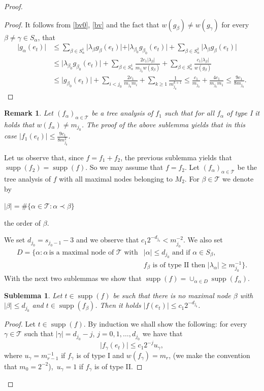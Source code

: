\documentclass[a4paper]{amsart}
\theoremstyle{plain}
\newtheorem{sublemma}[theorem]{Sublemma}
\newtheorem{remark}[theorem]{Remark}
\newcommand{\mc}{\mathcal}
\newcommand{\fa}{f_{\alpha}}
\newcommand{\fb}{f_{\beta}}
\newcommand{\fg}{f_{\gamma}}
\newcommand{\ga}{g_{\alpha}}
\newcommand{\gb}{g_{\beta}}
\DeclareMathOperator{\supp}{supp}
\begin{document}
\begin{proof}
\begin{proof}
It follows from \eqref{bv0}, \eqref{bv} and the fact that $w(\gb)\ne w(g_{\gamma})$ for every $\beta\ne\gamma\in S_{\alpha}$, that
\begin{align*}
\vert \ga(e_t)\vert & \leq\sum_{\beta\in S_{\alpha}^{1}}\vert\lambda_{\beta}g_{\beta}(e_t)\vert+
 \vert \lambda_{\beta_0}g_{\beta_0}(e_t)\vert+
 \sum_{\beta\in S_{\alpha}^{2}}\vert\lambda_{\beta} g_{\beta}(e_t)\vert
 \\
 &\leq
\vert \lambda_{\beta_0}g_{\beta_0}(e_t)\vert+
 \sum_{\beta\in S_{\alpha}^{1}}\frac{2c_{1}\vert\lambda_{\beta}\vert}{m_{j_0}w(\gb)}+
\sum_{\beta\in S_{\alpha}^{2}}\frac{c_{1}\vert\lambda_{\beta}\vert}{w(\gb)}
\\
&\leq
\vert g_{\beta_0}(e_t)\vert+
 \sum_{i<j_0}\frac{2c_{1}}{m_{j_0}m_{i}}
+
 \sum_{k\geq 1}\frac{1}{m_{j_0}^{k+1}}
\leq
\frac{c_{1}}{{m_{j_0}}}+
 \frac{4c_{1}}{m_{j_0}m_{1}}\leq \frac{9c_{1}}{8m_{j_0}}.
\end{align*}
\end{proof}
\begin{remark}\label{re4.5} Let $(\fa)_{\alpha\in\mc{T}}$ be a tree analysis of $f_1$ such that for all $\fa$ of type I it holds that $w(\fa)\ne m_{j_0}$. The proof of the above sublemma yields that in this case $\vert f_{1}(e_{t})\vert\leq \frac{9c_{1}}{8m_{j_0}^{2}}$.
\end{remark}
Let us observe that, since $f=f_1+f_2$, the previous sublemma yields that $\supp(f_2)=\supp(f)$.
So we may assume that $f=f_2$. Let $(\fa)_{\alpha\in\mc{T}}$ be the tree analysis of $f$ with all maximal nodes belonging to $M_{2}$.  For $\beta\in\mc{T}$ we denote by
\begin{center}
$\vert\beta\vert=\#\{\alpha\in\mc{T}:\alpha\prec\beta\}$
\end{center}
the order of $\beta$.

We set $d_{j_0}=s_{j_0-1}-3$ and we observe that  $c_{1}2^{-d_{j_0}}<m^{-2}_{j_0}$.
We also set \begin{align*}
D=\{\alpha:\alpha\,
\text{is a maximal node of $\mc{T}$ with} &\text{$\vert \alpha\vert\leq d_{j_0}$ and if  $\alpha\in S_{\beta}$,}\\
&\text{$\fb$ is of type II then $\vert\lambda_{\alpha}\vert\geq m_{j_0}^{-1}$}\}.
\end{align*}
With the next  two sublemmas  we  show that $\supp (f)=\cup_{\alpha\in D}\supp (\fa)$.
\begin{sublemma}\label{sl4.6}
Let $t\in\supp (f)$ be such that there is no  maximal node $\beta$
with $\vert \beta\vert \leq d_{j_0}$ and $t\in \supp(\fb)$. Then it
holds $\vert f(e_t)\vert\leq c_{1}2^{-d_{j_0}}$.
\end{sublemma}
\begin{proof}
Let $t\in\supp(f)$. By induction we shall show the following:
for every $\gamma\in\mathcal{T}$ such that $\vert \gamma\vert =d_{j_0}-j$, $j=0,1,\dots,d_{j_0}$
we have that
\begin{equation}
\vert \fg (e_t)\vert\leq c_{1}2^{-j}u_{\gamma},
\end{equation}
where $u_{\gamma}=m^{-1}_{r-1}$ if  $\fg$ is of type I and $w(\fg)=m_{r}$, (we make the
convention that $m_0=2^{-2}$),\, $u_{\gamma}=1$  if $\fg$ is of type II.


\end{proof}
\end{proof}
\end{document}
